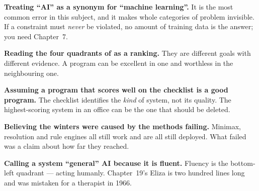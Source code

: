 \begin{pitfall}
\begin{tight}
  \item \textbf{Treating ``AI'' as a synonym for ``machine learning''.} It is the
        most common error in this subject, and it makes whole categories of
        problem invisible. If a constraint must \emph{never} be violated, no
        amount of training data is the answer; you need Chapter~7.
  \item \textbf{Reading the four quadrants of  as a ranking.} They
        are different goals with different evidence. A program can be excellent
        in one and worthless in the neighbouring one.
  \item \textbf{Assuming a program that scores well on the checklist is a good
        program.} The checklist identifies the \emph{kind} of system, not its
        quality. The highest-scoring system in an office can be the one that
        should be deleted.
  \item \textbf{Believing the winters were caused by the methods failing.}
        Minimax, resolution and rule engines all still work and are all still
        deployed. What failed was a claim about how far they reached.
  \item \textbf{Calling a system ``general'' AI because it is fluent.} Fluency is
        the bottom-left quadrant --- acting humanly. Chapter~19's Eliza is
        two hundred lines long and was mistaken for a therapist in 1966.
\end{tight}
\end{pitfall}


